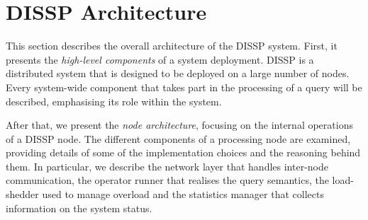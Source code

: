 \section{DISSP Architecture} 
% 
% 
This section describes the overall architecture of the DISSP system.
First, it presents the \emph{high-level components} of a system deployment. DISSP is a distributed
system that is designed to be deployed on a large number of nodes. Every system-wide component that
takes part in the processing of a query will be described, emphasising its role within the
system.

After that, we present the \emph{node architecture}, focusing on the internal operations of a
DISSP node. The different components of a processing node are examined, providing details of some of the
implementation choices and the reasoning behind them. In particular, we describe the
network layer that handles inter-node communication, the operator runner that realises the query
semantics, the load-shedder used to manage overload and the statistics manager that collects
information on the system status.
% 
% 

